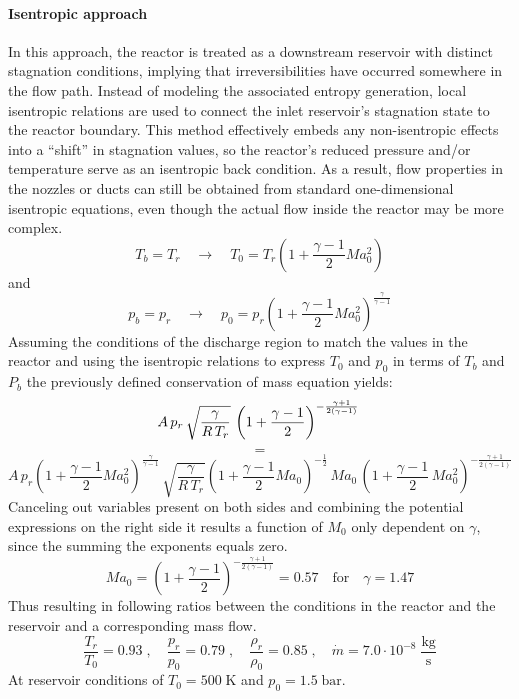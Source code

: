 \paragraph{Isentropic approach}
	In this approach, the reactor is treated as a downstream reservoir with distinct stagnation conditions, implying that irreversibilities have occurred somewhere in the flow path.
	Instead of modeling the associated entropy generation, local isentropic relations are used to connect the inlet reservoir’s stagnation state to the reactor boundary.
	This method effectively embeds any non-isentropic effects into a “shift” in stagnation values, so the reactor’s reduced pressure and/or temperature serve as an isentropic back condition.
	As a result, flow properties in the nozzles or ducts can still be obtained from standard one-dimensional isentropic equations, even though the actual flow inside the reactor may be more complex.
	$$
		T_b = T_r
		\quad \to \quad
		T_0 = T_r \left(1 + \frac{\gamma - 1}{2}Ma_0^2 \right)
	$$
	and
	$$
		p_b = p_r
		\quad \to \quad
		p_0 = p_r \left(1 + \frac{\gamma - 1}{2}Ma_0^2 \right)^{\frac{\gamma}{\gamma - 1}}
	$$
	Assuming the conditions of the discharge region to match the values in the reactor and using the isentropic relations to express $T_0$ and $p_0$ in terms of $T_b$ and $P_b$ the previously defined conservation of mass equation yields:
	$$
		A\, p_r\, \sqrt{\frac{\gamma}{R\,T_r}}\,\left(1+\frac{\gamma-1}{2}\right)^{-\frac{\gamma+1}{2(\gamma-1)}}\\
	$$
	$$
		=
	$$
	$$
		A\, p_r\left(1 + \frac{\gamma - 1}{2}Ma_0^2\right)^{\frac{\gamma}{\gamma-1}}\, \sqrt{\frac{\gamma}{R\,T_r}}\left(1 + \frac{\gamma - 1}{2}Ma_0\right)^{-\frac{1}{2}}\, Ma_0\,\left(1+\frac{\gamma-1}{2}\,Ma_0^2\right)^{-\frac{\gamma+1}{2(\gamma-1)}}
	$$
	Canceling out variables present on both sides and combining the potential expressions on the right side it results a function of $M_0$ only dependent on $\gamma$, since the summing the exponents equals zero.
	$$
		Ma_0 = (1 + \frac{\gamma - 1}{2})^{-\frac{\gamma + 1}{2(\gamma - 1)}}= 0.57
		\quad \text{for} \quad \gamma = 1.47
	$$
	Thus resulting in following ratios between the conditions in the reactor and the reservoir and a corresponding mass flow.
	$$
		\frac{T_r}{T_0} = 0.93\;,
			\quad
		\frac{p_r}{p_0} = 0.79\;,
			\quad
		\frac{\rho_r}{\rho_0} = 0.85\;,
			\quad
		\dot{m} = 7.0 \cdot 10^{-8}\; \frac{\text{kg}}{\text{s}}
	$$
	At reservoir conditions of $T_0 = 500\;\text{K}$ and $p_0 = 1.5\;\text{bar}$.
	\newpage
